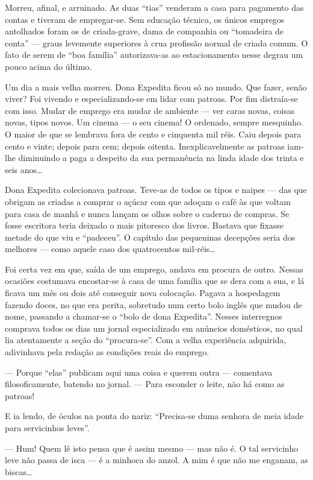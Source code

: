 Morreu, afinal, e arruinado. As duas ``tias'' venderam a casa para
pagamento das contas e tiveram de empregar-se. Sem educação técnica, os
únicos empregos antolhados foram os de criada-grave, dama de companhia
ou ``tomadeira de conta'' --- graus levemente superiores à crua
profissão normal de criada comum. O fato de serem de ``boa família''
autorizava-as ao estacionamento nesse degrau um pouco acima do último.

Um dia a mais velha morreu. Dona Expedita ficou só no mundo. Que fazer,
senão viver? Foi vivendo e especializando-se em lidar com patroas. Por
fim distraía-se com isso. Mudar de emprego era mudar de ambiente --- ver
caras novas, coisas novas, tipos novos. Um cinema --- o seu cinema! O
ordenado, sempre mesquinho. O maior de que se lembrava fora de cento e
cinquenta mil réis. Caiu depois para cento e vinte; depois para cem;
depois oitenta. Inexplicavelmente as patroas iam-lhe diminuindo a paga a
despeito da sua permanência na linda idade dos trinta e seis anos\ldots{}

Dona Expedita colecionava patroas. Teve-as de todos os tipos e naipes
--- das que obrigam as criadas a comprar o açúcar com que adoçam o café
às que voltam para casa de manhã e nunca lançam os olhos sobre o caderno
de compras. Se fosse escritora teria deixado o mais pitoresco dos
livros. Bastava que fixasse metade do que viu e ``padeceu''. O capítulo
das pequeninas decepções seria dos melhores --- como aquele caso dos
quatrocentos mil-réis\ldots{}

Foi certa vez em que, saída de um emprego, andava em procura de outro.
Nessas ocasiões costumava encostar-se à casa de uma família que se dera
com a sua, e lá ficava um mês ou dois até conseguir nova colocação.
Pagava a hospedagem fazendo doces, no que era perita, sobretudo num
certo bolo inglês que mudou de nome, passando a chamar-se o ``bolo de
dona Expedita''. Nesses interregnos comprava todos os dias um jornal
especializado em anúncios domésticos, no qual lia atentamente a seção do
``procura-se''. Com a velha experiência adquirida, adivinhava pela
redação as condições reais do emprego.

--- Porque ``elas'' publicam aqui uma coisa e querem outra --- comentava
filosoficamente, batendo no jornal. --- Para esconder o leite, não há
como as patroas!

E ia lendo, de óculos na ponta do nariz: ``Precisa-se duma senhora de
meia idade para servicinhos leves''.

--- Hum! Quem lê isto pensa que é assim mesmo --- mas não é. O tal
servicinho leve não passa de isca --- é a minhoca do anzol. A mim é que
não me enganam, as biscas\ldots{}

